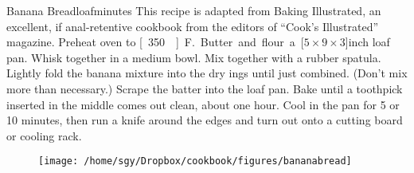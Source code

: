 \begin{recipe}{Banana Bread}{\unit[1]{loaf}}{\unit[90]{minutes}}
\freeform This recipe is adapted from Baking Illustrated, an excellent, if anal-retentive cookbook from the editors of ``Cook's Illustrated'' magazine.
\newstep Preheat oven to \unit[350\0]{F.} Butter and flour a \unit[$5\times 9\times 3$]{inch} loaf pan.
Whisk together in a medium bowl.
Mix together with a rubber spatula. Lightly fold the banana mixture
into the dry ings until just combined. (Don't mix more than
necessary.) Scrape the batter into the loaf pan. Bake until a toothpick
inserted in the middle comes out clean, about one hour. Cool in the
pan for 5 or 10 minutes, then run a knife around the edges and turn
out onto a cutting board or cooling rack.
\end{recipe}
\begin{figure}[h!]
\begin{center}
\texttt{[image: /home/sgy/Dropbox/cookbook/figures/bananabread]}
\end{center}
\end{figure}
